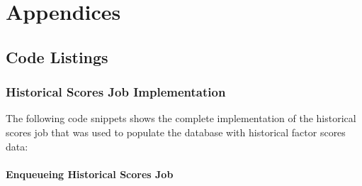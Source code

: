\documentclass[11pt,english,a4paper,hidelinks]{book}
\begin{document}
\part{Appendices}
\makeatletter
\renewcommand{\@chapapp}{Appendix}
\makeatother

\chapter{Code Listings}
\section{Historical Scores Job Implementation}
\label{app:historical_scores_job}

\noindent The following code snippets shows the complete implementation of the historical scores job that was used to populate the database with historical factor scores data:

\subsection{Enqueueing Historical Scores Job}
\end{document}

